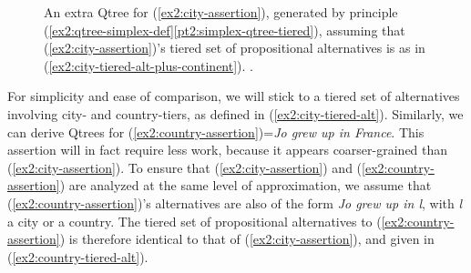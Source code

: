 \begin{exe}
	\label{ex2:city-tiered-alt-plus-continent}
\end{exe} 

\begin{figure}[H]
	\centering
	\caption{An extra Qtree for (\ref{ex2:city-assertion}), generated by principle (\ref{ex2:qtree-simplex-def}\ref{pt2:simplex-qtree-tiered}), assuming that (\ref{ex2:city-assertion})'s tiered set of propositional alternatives is as in (\ref{ex2:city-tiered-alt-plus-continent}). .}\label{fig2:city-qtree-tiered-plus-continent}
\end{figure}

For simplicity and ease of comparison, we will stick to a tiered set of alternatives involving city- and country-tiers, as defined in (\ref{ex2:city-tiered-alt}). Similarly, we can derive Qtrees for (\ref{ex2:country-assertion})=\textit{Jo grew up in France}. This assertion will in fact require less work, because it appears coarser-grained than (\ref{ex2:city-assertion}). To ensure that (\ref{ex2:city-assertion}) and (\ref{ex2:country-assertion}) are analyzed at the same level of approximation, we assume that (\ref{ex2:country-assertion})'s alternatives are also of the form \textit{Jo grew up in l}, with \textit{l} a city or a country. The tiered set of propositional alternatives to (\ref{ex2:country-assertion}) is therefore identical to that of (\ref{ex2:city-assertion}), and given in (\ref{ex2:country-tiered-alt}).

